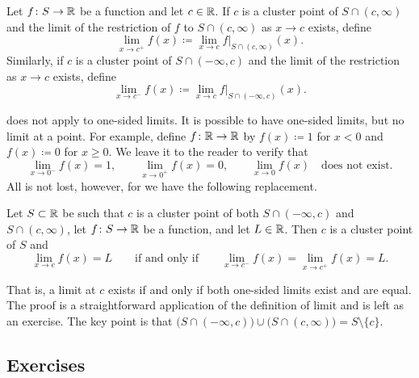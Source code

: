 \begin{defn} \label{defn:onesidedlimits}
Let $f \colon S \to {\mathbb{R}}$ be a function and let $c \in {\mathbb{R}}$.  If
$c$ is a cluster point of
$S \cap (c,\infty)$
and the limit
of the restriction of $f$ to $S \cap (c,\infty)$ 
 as $x \to c$ exists, define
\begin{equation*}
\lim_{x \to c^+} f(x) \coloneqq \lim_{x\to c} f|_{S \cap (c,\infty)}(x) .
\end{equation*}
Similarly, if $c$ is a cluster point of 
$S \cap (-\infty,c)$ and the limit of the restriction as $x \to c$
exists, define
\begin{equation*}
\lim_{x \to c^-} f(x) \coloneqq \lim_{x\to c} f|_{S \cap (-\infty,c)}(x) .
\end{equation*}
\end{defn}

 does not apply to one-sided limits.
It is possible to have one-sided limits, but no limit at a point.  For
example, define $f \colon {\mathbb{R}} \to {\mathbb{R}}$ by $f(x) \coloneqq 1$ for $x < 0$ and
$f(x) \coloneqq 0$ for $x \geq 0$.
We leave it to the reader to verify that
\begin{equation*}
\lim_{x \to 0^-} f(x) = 1, \qquad
\lim_{x \to 0^+} f(x) = 0, \qquad
\lim_{x \to 0} f(x) \quad \text{does not exist.}
\end{equation*}
All is not lost, however, for we have the following replacement.

\begin{prop} \label{prop:onesidedlimits}
Let $S \subset {\mathbb{R}}$ be such that $c$ is a cluster point
of both $S \cap (-\infty,c)$ and $S \cap (c,\infty)$, let
$f \colon S \to {\mathbb{R}}$ be a function, and let $L \in {\mathbb{R}}$.  Then $c$ is a cluster point of $S$ and
\begin{equation*}
\lim_{x \to c} f(x) = L
\qquad \text{if and only if} \qquad
\lim_{x \to c^-} f(x) =
\lim_{x \to c^+} f(x) =
L .
\end{equation*}
\end{prop}

That is, a limit at $c$ exists if and only if both one-sided limits exist and are equal.  The
proof is a straightforward application of the definition of limit
and is left as an exercise.  The key point is that
$\bigl( S \cap (-\infty,c) \bigr) \cup \bigl( S \cap (c,\infty) \bigr)
= S \setminus \{ c \}$.

\subsection{Exercises}

